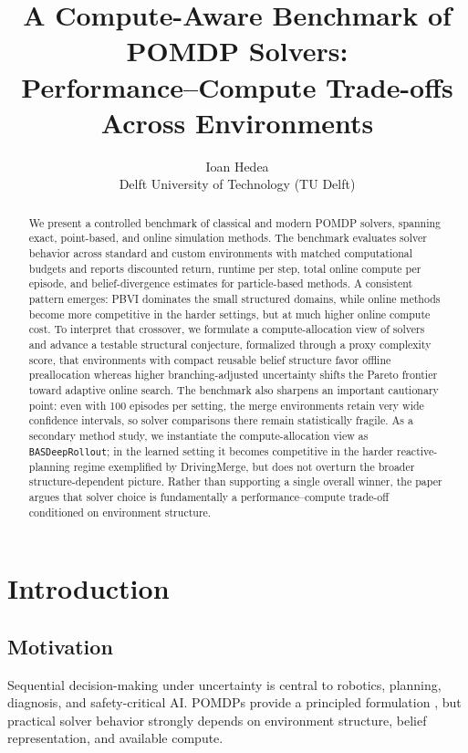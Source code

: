 \documentclass[10pt,twocolumn]{article}
\title{A Compute-Aware Benchmark of POMDP Solvers: \\
Performance--Compute Trade-offs Across Environments}
\author{%
  Ioan Hedea \\
  Delft University of Technology (TU Delft)
}
\begin{document}
\maketitle

\begin{abstract}
We present a controlled benchmark of classical and modern POMDP solvers, spanning exact, point-based, and online simulation methods. The benchmark evaluates solver behavior across standard and custom environments with matched computational budgets and reports discounted return, runtime per step, total online compute per episode, and belief-divergence estimates for particle-based methods. A consistent pattern emerges: PBVI dominates the small structured domains, while online methods become more competitive in the harder settings, but at much higher online compute cost. To interpret that crossover, we formulate a compute-allocation view of solvers and advance a testable structural conjecture, formalized through a proxy complexity score, that environments with compact reusable belief structure favor offline preallocation whereas higher branching-adjusted uncertainty shifts the Pareto frontier toward adaptive online search. The benchmark also sharpens an important cautionary point: even with 100 episodes per setting, the merge environments retain very wide confidence intervals, so solver comparisons there remain statistically fragile. As a secondary method study, we instantiate the compute-allocation view as \texttt{BASDeepRollout}; in the learned setting it becomes competitive in the harder reactive-planning regime exemplified by DrivingMerge, but does not overturn the broader structure-dependent picture. Rather than supporting a single overall winner, the paper argues that solver choice is fundamentally a performance--compute trade-off conditioned on environment structure.
\end{abstract}

\section{Introduction}

\subsection{Motivation}
Sequential decision-making under uncertainty is central to robotics, planning, diagnosis, and safety-critical AI. POMDPs provide a principled formulation \citep{kaelbling1998planning}, but practical solver behavior strongly depends on environment structure, belief representation, and available compute.
\end{document}
